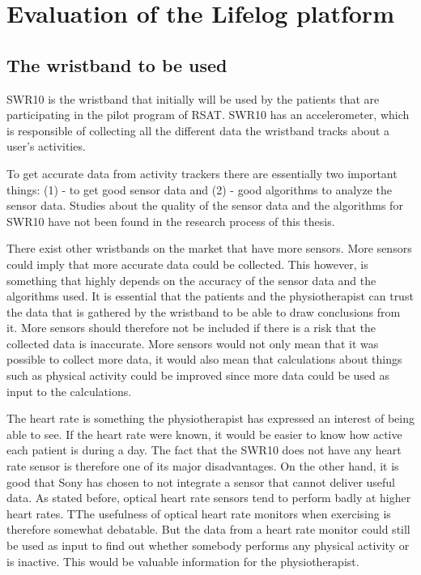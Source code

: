 \documentclass{cslthse-msc}
\begin{document}
\section{Evaluation of the Lifelog platform}
\label{sec:utLifelog}

\subsection{The wristband to be used}
SWR10 is the wristband that initially will be used by the patients that are participating in the pilot program of RSAT. SWR10 has an accelerometer, which is responsible of collecting all the different data the wristband tracks about a user’s activities.

To get accurate data from activity trackers there are essentially two important things: (1) - to get good sensor data and (2) - good algorithms to analyze the sensor data. Studies about the quality of the sensor data and the algorithms for SWR10 have not been found in the research process of this thesis.   

There exist other wristbands on the market that have more sensors. More sensors could imply that more accurate data could be collected. This however, is something that highly depends on the accuracy of the sensor data and the algorithms used. It is essential that the patients and the physiotherapist can trust the data that is gathered by the wristband to be able to draw conclusions from it. More sensors should therefore not be included if there is a risk that the collected data is inaccurate. More sensors would not only mean that it was possible to collect more data, it would also mean that calculations about things such as physical activity could be improved since more data could be used as input to the calculations. %


The heart rate is something the physiotherapist has expressed an interest of being able to see. If the heart rate were known, it would be easier to know how active each patient is during a day. The fact that the SWR10 does not have any heart rate sensor is therefore one of its major disadvantages. On the other hand, it is good that Sony has chosen to not integrate a sensor that cannot deliver useful data. As stated before, optical heart rate sensors tend to perform badly at higher heart rates. TThe usefulness of optical heart rate monitors when exercising is therefore somewhat debatable. But the data from a heart rate monitor could still be used as input to find out whether somebody performs any physical activity or is inactive. This would be valuable information for the physiotherapist.
\end{document}
